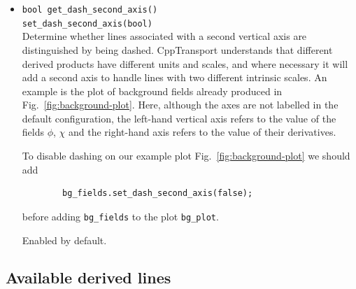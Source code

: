\documentclass[11pt,a4paper]{article}
\newcommand{\packagefont}{\sffamily}
\newcommand{\CppTransport}{{\packagefont CppTransport}}
\begin{document}
\begin{itemize}
	\item \texttt{bool get_dash_second_axis()} \\
	\texttt{set_dash_second_axis(bool)} \\
	Determine whether lines associated with a second vertical axis
	are distinguished by being dashed.
	{\CppTransport} understands that different derived products have different
    units and scales,
    and where necessary it will add a second axis to handle lines
    with two different intrinsic scales.
    An example is the plot of background fields already produced
    in Fig.~\ref{fig:background-plot}.
    Here, although the axes are not labelled in the default configuration,
    the left-hand vertical axis refers to the value of the fields
    $\phi$, $\chi$
    and the right-hand axis refers to the value of their
    derivatives.
    
    To disable dashing on our example plot Fig.~\ref{fig:background-plot}
    we should add
    \begin{verbatim}
        bg_fields.set_dash_second_axis(false);    
    \end{verbatim}
    before adding \texttt{bg_fields} to the plot
    \texttt{bg_plot}.
    
    Enabled by default.
\end{itemize}

\subsection{Available derived lines}
\label{sec:derived-lines}
\end{document}
